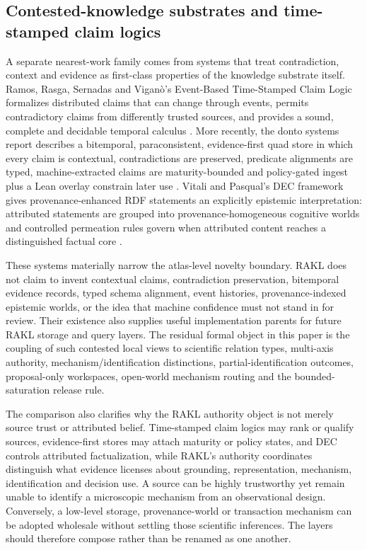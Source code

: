\subsection{Contested-knowledge substrates and time-stamped claim logics}

A separate nearest-work family comes from systems that treat contradiction, context and evidence as first-class properties of the knowledge substrate itself. Ramos, Rasga, Sernadas and Vigan\`o's Event-Based Time-Stamped Claim Logic formalizes distributed claims that can change through events, permits contradictory claims from differently trusted sources, and provides a sound, complete and decidable temporal calculus \cite{ramos2021eventclaim}. More recently, the donto systems report describes a bitemporal, paraconsistent, evidence-first quad store in which every claim is contextual, contradictions are preserved, predicate alignments are typed, machine-extracted claims are maturity-bounded and policy-gated ingest plus a Lean overlay constrain later use \cite{donto2026}. Vitali and Pasqual's DEC framework gives provenance-enhanced RDF statements an explicitly epistemic interpretation: attributed statements are grouped into provenance-homogeneous cognitive worlds and controlled permeation rules govern when attributed content reaches a distinguished factual core \cite{vitali2026dec}.

These systems materially narrow the atlas-level novelty boundary. RAKL does not claim to invent contextual claims, contradiction preservation, bitemporal evidence records, typed schema alignment, event histories, provenance-indexed epistemic worlds, or the idea that machine confidence must not stand in for review. Their existence also supplies useful implementation parents for future RAKL storage and query layers. The residual formal object in this paper is the coupling of such contested local views to scientific relation types, multi-axis authority, mechanism/identification distinctions, partial-identification outcomes, proposal-only workspaces, open-world mechanism routing and the bounded-saturation release rule.

The comparison also clarifies why the RAKL authority object is not merely source trust or attributed belief. Time-stamped claim logics may rank or qualify sources, evidence-first stores may attach maturity or policy states, and DEC controls attributed factualization, while RAKL's authority coordinates distinguish what evidence licenses about grounding, representation, mechanism, identification and decision use. A source can be highly trustworthy yet remain unable to identify a microscopic mechanism from an observational design. Conversely, a low-level storage, provenance-world or transaction mechanism can be adopted wholesale without settling those scientific inferences. The layers should therefore compose rather than be renamed as one another.
